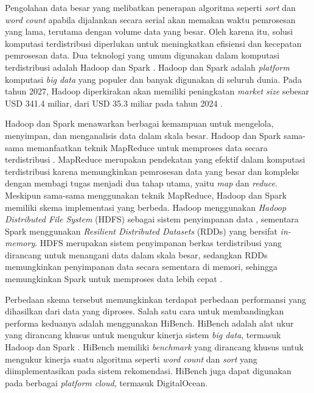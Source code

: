 Pengolahan data besar yang melibatkan penerapan algoritma seperti \textit{sort} dan \textit{word count} apabila dijalankan secara serial akan memakan waktu pemrosesan yang lama, terutama dengan volume data yang besar. Oleh karena itu, solusi komputasi terdistribusi diperlukan untuk meningkatkan efisiensi dan kecepatan pemrosesan data. Dua teknologi yang umum digunakan dalam komputasi terdistribusi adalah Hadoop dan Spark \cite{saputroPerbandinganKinerjaKomputasi2020}. Hadoop dan Spark adalah \textit{platform} komputasi \textit{big data} yang populer dan banyak digunakan di seluruh dunia. Pada tahun 2027, Hadoop diperkirakan akan memiliki peningkatan \textit{market size} sebesar USD 341.4 miliar, dari USD 35.3 miliar pada tahun 2024 \cite{HadoopMarketSize}.

Hadoop dan Spark menawarkan berbagai kemampuan untuk mengelola, menyimpan, dan menganalisis data dalam skala besar. Hadoop dan Spark sama-sama memanfaatkan teknik MapReduce untuk memproses data secara terdistribusi \cite{deanMapReduceSimplifiedData2004}. MapReduce merupakan pendekatan yang  efektif dalam komputasi terdistribusi karena memungkinkan pemrosesan data yang besar dan kompleks dengan membagi tugas menjadi dua tahap utama, yaitu \textit{map} dan \textit{reduce}. Meskipun sama-sama menggunakan teknik MapReduce, Hadoop dan Spark memiliki skema implementasi yang berbeda. Hadoop menggunakan \textit{Hadoop Distributed File System} (HDFS) sebagai sistem penyimpanan data \cite{samadiComparativeStudyHadoop2016}, sementara Spark menggunakan \textit{Resilient Distributed Datasets} (RDDs) yang bersifat \textit{in-memory}. HDFS merupakan sistem penyimpanan berkas terdistribusi yang dirancang untuk menangani data dalam skala besar, sedangkan RDDs memungkinkan penyimpanan data secara sementara di memori, sehingga memungkinkan Spark untuk memproses data lebih cepat \cite{ahmadvandGapproxUsingGallup2019}. 

Perbedaan skema tersebut memungkinkan terdapat perbedaan performansi yang dihasilkan dari data yang diproses. Salah satu cara untuk membandingkan performa keduanya adalah menggunakan HiBench. HiBench adalah alat ukur yang dirancang khusus untuk mengukur kinerja sistem \textit{big data}, termasuk Hadoop dan Spark \cite{huangHiBenchBenchmarkSuitea}. HiBench memiliki \textit{benchmark} yang dirancang khusus untuk mengukur kinerja suatu algoritma seperti \textit{word count} dan \textit{sort} yang diimplementasikan pada sistem rekomendasi. HiBench juga dapat digunakan pada berbagai \textit{platform cloud}, termasuk DigitalOcean.

